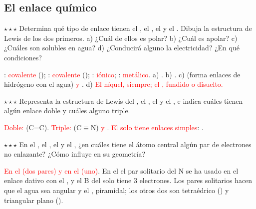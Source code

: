 \subsection{El enlace químico}

\begin{exercise}
    \(\star\star\star\) Determina qué tipo de enlace tienen el , el , el  y el . Dibuja la estructura
    de Lewis de los dos primeros. a) ¿Cuál de ellos es polar? b) ¿Cuál es apolar? c) ¿Cuáles son solubles en agua? d) ¿Conducirá
    alguno la electricidad? ¿En qué condiciones?
    \begin{solu}
        : \textcolor{red}{covalente} ();
        : \textcolor{red}{covalente} (); : \textcolor{red}{iónico}; :
        \textcolor{red}{metálico}. a) \textcolor{red}{}. b) \textcolor{red}{}. c) \textcolor{red}{} (forma
        enlaces de hidrógeno con el agua) \textcolor{red}{y }. d) \textcolor{red}{El níquel, siempre; el ,
        fundido o disuelto.}
    \end{solu}
\end{exercise}

\begin{exercise}
    \(\star\star\star\) Representa la estructura de Lewis del , el , el  y el , e indica cuáles
    tienen algún enlace doble y cuáles alguno triple.
    \begin{solu}
        \textcolor{red}{Doble: } (C=C). \textcolor{red}{Triple: } (C\(\equiv\)N) \textcolor{red}{y }.
        \textcolor{red}{El  solo tiene enlaces simples}:
        .
    \end{solu}
\end{exercise}

\begin{exercise}
    \(\star\star\star\) En el , el , el  y el , ¿en cuáles tiene el átomo central algún par de
    electrones no enlazante? ¿Cómo influye en su geometría?
    \begin{solu}
        \textcolor{red}{En el  (dos pares) y en el  (uno)}. En el  el par solitario del N se ha usado
        en el enlace dativo con el , y el B del  solo tiene 3 electrones. Los pares solitarios hacen que el agua
        sea angular y el , piramidal; los otros dos son tetraédrico () y triangular plano ().
    \end{solu}
\end{exercise}

